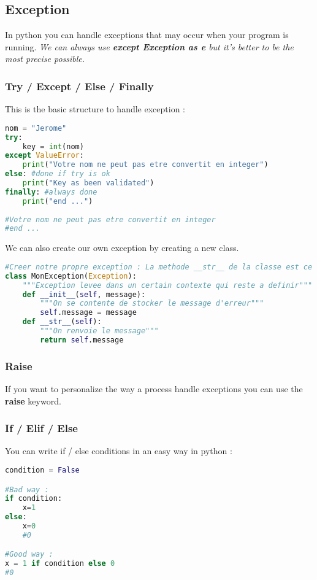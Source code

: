 \documentclass[a4paper, 12pt, titlepage]{scrartcl} %
\begin{document}
\subsection{Exception}
In python you can handle exceptions that may occur when your program is running. \textit{We can always use \textbf{except Exception as e} but it's better to be the most precise possible.}
\subsubsection{Try / Except / Else / Finally}
This is the basic structure to handle exception :
\label{TEEF}
\begin{lstlisting}[language=Python]
nom = "Jerome"
try:
	key = int(nom)
except ValueError:
	print("Votre nom ne peut pas etre convertit en integer")
else: #done if try is ok
	print("Key as been validated")
finally: #always done
	print("end ...")
	
#Votre nom ne peut pas etre convertit en integer
#end ...
\end{lstlisting}

We can also create our own exception by creating a new class.
\begin{lstlisting}[language=Python]
#Creer notre propre exception : La methode __str__ de la classe est ce qui est appele pour afficher le message d'erreur
class MonException(Exception):
    """Exception levee dans un certain contexte qui reste a definir"""
    def __init__(self, message):
        """On se contente de stocker le message d'erreur"""
        self.message = message
    def __str__(self):
        """On renvoie le message"""
        return self.message
\end{lstlisting}

\subsubsection{Raise}
\label{Raise}
If you want to personalize the way a process handle exceptions you can use the \textbf{raise} keyword.


\subsubsection{If / Elif / Else}
\label{IEE}
You can write if / else conditions in an easy way in python :
\begin{lstlisting}[language=Python]
condition = False

#Bad way :
if condition:
	x=1
else:
	x=0
	#0

#Good way :
x = 1 if condition else 0
#0
\end{lstlisting}
\end{document}
